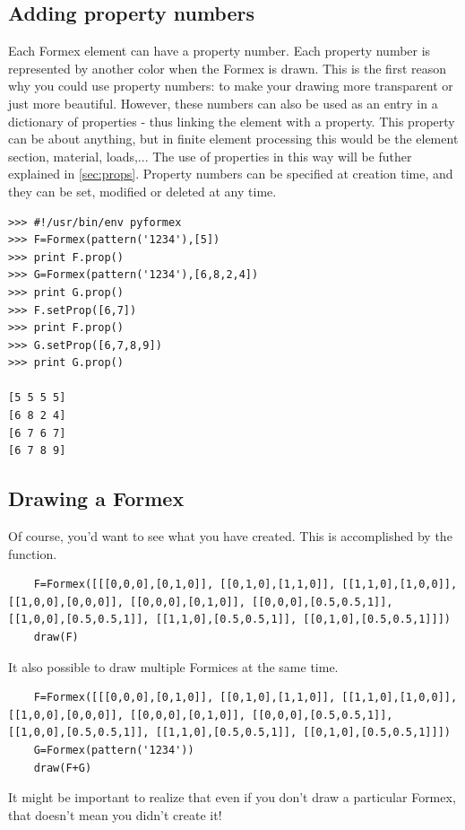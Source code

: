 \documentclass[a4paper]{manual}
\begin{document}
{\subsection{Adding property numbers}
\label{subsec:propnr}
Each Formex element can have a property number. Each property number is represented by another color when the Formex is drawn. This is the first reason why you could use property numbers: to make your drawing more transparent or just more beautiful. However, these numbers can also be used as an entry in a dictionary of properties - thus linking the element with a property. This property can be about anything, but in finite element processing this would be the element section, material, loads,... The use of properties in this way will be futher explained in \ref{sec:props}.
Property numbers can be specified at creation time, and they can be set, modified or deleted at any time.  
\begin{verbatim}
>>> #!/usr/bin/env pyformex
>>> F=Formex(pattern('1234'),[5])
>>> print F.prop()
>>> G=Formex(pattern('1234'),[6,8,2,4])
>>> print G.prop()
>>> F.setProp([6,7])
>>> print F.prop()
>>> G.setProp([6,7,8,9])
>>> print G.prop()

[5 5 5 5]
[6 8 2 4]
[6 7 6 7]
[6 7 8 9]
\end{verbatim}

\subsection{Drawing a Formex}
\label{subsec:drawing}
Of course, you'd want to see what you have created. This is accomplished by the  function. 
\begin{verbatim}
	F=Formex([[[0,0,0],[0,1,0]], [[0,1,0],[1,1,0]], [[1,1,0],[1,0,0]], [[1,0,0],[0,0,0]], [[0,0,0],[0,1,0]], [[0,0,0],[0.5,0.5,1]], 		[[1,0,0],[0.5,0.5,1]], [[1,1,0],[0.5,0.5,1]], [[0,1,0],[0.5,0.5,1]]])
	draw(F)
\end{verbatim}

It also possible to draw multiple Formices at the same time.
\begin{verbatim}
	F=Formex([[[0,0,0],[0,1,0]], [[0,1,0],[1,1,0]], [[1,1,0],[1,0,0]], [[1,0,0],[0,0,0]], [[0,0,0],[0,1,0]], [[0,0,0],[0.5,0.5,1]], 		[[1,0,0],[0.5,0.5,1]], [[1,1,0],[0.5,0.5,1]], [[0,1,0],[0.5,0.5,1]]])	
	G=Formex(pattern('1234'))
	draw(F+G)
\end{verbatim}
 
It might be important to realize that even if you don't draw a particular Formex, that doesn't mean you didn't create it!

}
\end{document}
